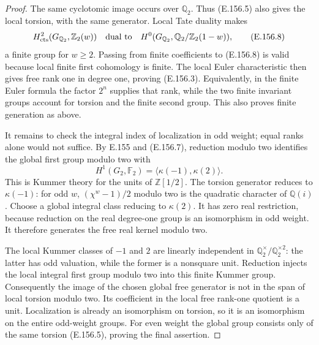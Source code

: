 \begin{proof}
The same cyclotomic image occurs over \(\mathbb Q_2\).
Thus (E.156.5) also gives the local torsion, with the
same generator. Local Tate duality makes
\[
 H^2_{\rm cts}(G_{\mathbb Q_2},\mathbb Z_2(w))
 \quad\hbox{dual to}\quad
 H^0(G_{\mathbb Q_2},\mathbb Q_2/\mathbb Z_2(1-w)),
 \tag{E.156.8}
\]
a finite group for \(w\geq2\).
Passing from finite coefficients to (E.156.8) is valid
because local finite first cohomology is finite.
The local Euler characteristic
\citep[I.2.3, p.~28; I.2.8, p.~31]{CohMilneADT}
then gives free rank one in degree one, proving
(E.156.3). Equivalently, in the finite Euler formula the
factor \(2^n\) supplies that rank, while the two finite
invariant groups account for torsion and the finite
second group. This also proves finite generation as above.

It remains to check the integral index of localization
in odd weight; equal ranks alone would not suffice.
By E.155 and (E.156.7), reduction modulo two identifies
the global first group modulo two with
\[
 H^1(G_2,\mathbb F_2)
       =\langle\kappa(-1),\kappa(2)\rangle.
 \tag{E.156.9}
\]
This is Kummer theory for the units of \(\mathbb Z[1/2]\).
The torsion generator reduces to \(\kappa(-1)\):
for odd \(w\), \((\chi^w-1)/2\) modulo two is the
quadratic character of \(\mathbb Q(i)\).
Choose a global integral class reducing to \(\kappa(2)\).
It has zero real restriction, because reduction on the
real degree-one group is an isomorphism in odd weight.
It therefore generates the free real kernel modulo two.

The local Kummer classes of \(-1\) and \(2\) are linearly
independent in \(\mathbb Q_2^\times/\mathbb Q_2^{\times2}\):
the latter has odd valuation, while the former is a
nonsquare unit. Reduction injects the local integral
first group modulo two into this finite Kummer group.
Consequently the image of the chosen global free generator
is not in the span of local torsion modulo two. Its
coefficient in the local free rank-one quotient is a unit.
Localization is already an isomorphism on torsion, so
it is an isomorphism on the entire odd-weight groups.
For even weight the global group consists only of the
same torsion (E.156.5), proving the final assertion.
\end{proof}
